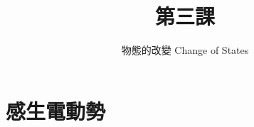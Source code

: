 \documentclass[14pt]{beamer}
\title{第三課}
\author{物態的改變 Change of States}
\institute{摘星周末班}
\date{}
\begin{document}
\frame{\titlepage}


\section{感生電動勢}

\end{document}
